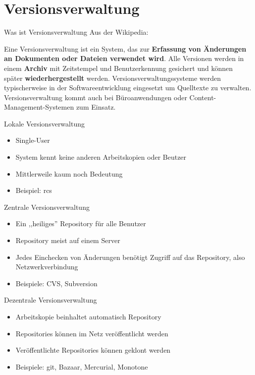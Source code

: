 \section{Versionsverwaltung}

\begin{frame}
  \tableofcontents[currentsection]
\end{frame}

\begin{frame}{Was ist Versionsverwaltung}
Aus der Wikipedia:

Eine Versionsverwaltung ist ein System,
das zur \textbf{Erfassung von Änderungen an
Dokumenten oder Dateien verwendet wird}.
Alle Versionen werden in einem \textbf{Archiv} mit
Zeitstempel und Benutzerkennung gesichert und können
später \textbf{wiederhergestellt} werden.
Versionsverwaltungssysteme werden typischerweise in der
Softwareentwicklung eingesetzt um Quelltexte zu verwalten.
Versionsverwaltung kommt auch bei Büroanwendungen oder
Content-Management-Systemen zum Einsatz.
\end{frame}

\begin{frame}{Lokale Versionsverwaltung}
  \begin{itemize}
    \item Single-User
    \item System kennt keine anderen Arbeitskopien oder Beutzer
    \item Mittlerweile kaum noch Bedeutung
    \item Beispiel: rcs
  \end{itemize}
\end{frame}

\begin{frame}{Zentrale Versionsverwaltung}
  \begin{itemize}
    \item Ein ,,heiliges'' Repository für alle Benutzer
    \item Repository meist auf einem Server
    \item Jedes Einchecken von Änderungen benötigt Zugriff auf das Repository, also Netzwerkverbindung
    \item Beispiele: CVS, Subversion
  \end{itemize}
\end{frame}

\begin{frame}{Dezentrale Versionsverwaltung}
  \begin{itemize}
    \item Arbeitskopie beinhaltet automatisch Repository
    \item Repositories können im Netz veröffentlicht werden
    \item Veröffentlichte Repositories können geklont werden
    \item Beispiele: git, Bazaar, Mercurial, Monotone
  \end{itemize}
\end{frame}

